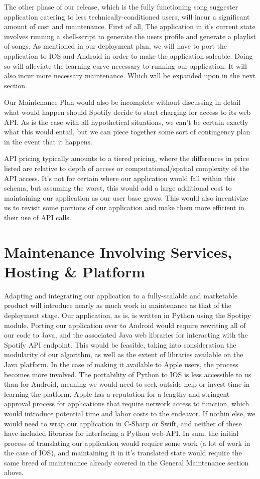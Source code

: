 \documentclass{roffin}
\begin{document}
The other phase of our release, which is the fully functioning song suggester application catering to less technically-conditioned users, will incur a significant amount of cost and maintenance. First of all, The application in it's current state involves running a shell-script to generate the users profile and generate a playlist of songs. As mentioned in our deployment plan, we will have to port the application to IOS and Android in order to make the application saleable. Doing so will alleviate the learning curve necessary to running our application. It will also incur more necessary maintenance. Which will be expanded upon in the next section. 

Our Maintenance Plan would also be incomplete without discussing in detail what would happen should Spotify decide to start charging for access to its web API. As is the case with all hypothetical situations, we can't be certain exactly what this would entail, but we can piece together some sort of contingency plan in the event that it happens.

API pricing typically amounts to a tiered pricing, where the differences in price listed are relative to depth of access or computational/spatial complexity of the API access. It's not for certain where our application would fall within this schema, but assuming the worst, this would add a large additional cost to maintaining our application as our user base grows.  This would also incentivize us to revisit some portions of our application and make them more efficient in their use of API calls. 


\section{Maintenance Involving Services, Hosting \& Platform}
Adapting and integrating our application to a fully-scalable and marketable product will introduce nearly as much work in maintenance as that of the deployment stage.  Our application, as is, is written in Python using the Spotipy module. Porting our application over to Android would require rewriting all of our code to Java, and the associated Java web libraries for interacting with the Spotify API endpoint.  This would be feasible, taking into consideration the modularity of our algorithm, as well as the extent of libraries available on the Java platform.  In the case of making it available to Apple users, the process becomes more involved. The portability of Python to IOS is less accessible to us than for Android, meaning we would need to seek outside help or invest time in learning the platform.  Apple has a reputation for a lengthy and stringent approval process for applications that require network access to function, which would introduce potential time and labor costs to the endeavor.  If nothin else, we would need to wrap our application in C-Sharp or Swift, and neither of these have included libraries for interfacing a Python web-API. In sum, the initial process of translating our application would require some work (a lot of work in the case of IOS), and maintaining it in it's translated state would require the same breed of maintenance already covered in the General Maintenance section above.
\end{document}
